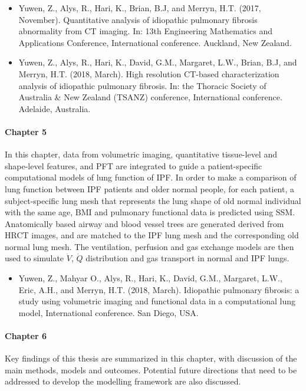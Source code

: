\begin{itemize}
  \item Yuwen, Z., Alys, R., Hari, K., Brian, B.J, and Merryn, H.T. (2017, November). Quantitative analysis of idiopathic pulmonary fibrosis abnormality from CT imaging. In: 13th Engineering Mathematics and Applications Conference, International conference. Auckland, New Zealand.
	\item Yuwen, Z., Alys, R., Hari, K., David, G.M., Margaret, L.W., Brian, B.J, and Merryn, H.T. (2018, March). High resolution CT-based characterization analysis of idiopathic pulmonary fibrosis. In: the Thoracic Society of Australia \& New Zealand (TSANZ) conference, International conference. Adelaide, Australia.
\end{itemize}

\paragraph{Chapter 5} In this chapter, data from volumetric imaging, quantitative tissue-level and shape-level features, and PFT are integrated to guide a patient-specific computational models of lung function of IPF. In order to make a comparison of lung function between IPF patients and older normal people, for each patient, a subject-specific lung mesh that represents the lung shape of old normal individual with the same age, BMI and pulmonary functional data is predicted using SSM. Anatomically based airway and blood vessel trees are generated derived from HRCT images, and are matched to the IPF lung mesh and the corresponding old normal lung mesh. The ventilation, perfusion and gas exchange models are then used to simulate $\dot{V}$, $\dot{Q}$ distribution and gas transport in normal and IPF lungs.

\begin{itemize}
  \item Yuwen, Z., Mahyar O., Alys, R., Hari, K., David, G.M., Margaret, L.W., Eric, A.H., and Merryn, H.T. (2018, March). Idiopathic pulmonary fibrosis: a study using volumetric imaging and functional data in a computational lung model, International conference. San Diego, USA.
\end{itemize}

\paragraph{Chapter 6} Key findings of this thesis are summarized in this chapter, with discussion of the main methods, models and outcomes. Potential future directions that need to be addressed to develop the modelling framework are also discussed. 
